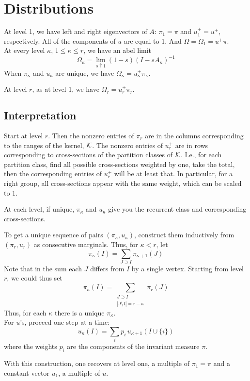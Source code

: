
\section{Distributions}
\label{sec:7.3}

At level 1, we have left and right eigenvectors of $A$: $\pi_1=\pi$ and $u_1^+=u^+$, respectively.
All of the components of $u$ are equal to 1. And $\Omega=\Omega_1=u^+\pi$.\\
At every level $\kappa$, $1\le \kappa\le r$, we have an abel limit 
$$
  \Omega_\kappa=\lim_{s\uparrow1} (1-s)(I-sA_\kappa)^{-1}
$$
When $\pi_\kappa$ and $u_\kappa$ are unique, we have $\Omega_\kappa=u_\kappa^+\pi_\kappa$.

At level $r$, as at level 1, we have $\Omega_r=u_r^+\pi_r$.


\subsection{Interpretation}
\label{sec:7.3.1}

Start at level $r$. Then the nonzero entries of $\pi_r$ are in the columns corresponding to the ranges of the kernel, ${\mathcal K}$. 
The nonzero entries of $u_r^+$ are in rows corresponding
to cross-sections of the partition classes of ${\mathcal K}$. 
I.e., for each partition class, find all possible cross-sections weighted by one, take the total, then the corresponding entries of $u_r^+$ will be at least that. 
In particular, for a right group, all cross-sections appear with the same weight, which can be scaled to 1.

At each level, if unique, $\pi_\kappa$ and $u_\kappa$ give you the recurrent class and corresponding cross-sections.

To get a unique sequence of pairs $(\pi_\kappa,u_\kappa)$, construct them inductively from 
$(\pi_r,u_r)$ as consecutive marginals. 
Thus, for $\kappa<r$, let
$$ 
  \pi_\kappa(I)=\sum_{J\supset I}\pi_{\kappa+1}(J) 
$$
Note that in the sum each $J$ differs from $I$ by a single vertex. Starting from level $r$, we could thus set
$$
  \pi_\kappa(I)
	=\sum_{\substack{J\supset I\\ |J\setminus I|=r-\kappa}}\pi_r(J) 
$$
Thus, for each $\kappa$ there is a unique $\pi_\kappa$.\\
For $u$'s, proceed one step at a time:
$$ u_\kappa(I)=\sum_i p_i \,u_{\kappa+1}(I\cup \{i\}) $$
where the weights $p_i$ are the components of the invariant measure $\pi$.

With this construction, one recovers at level one, a multiple of $\pi_1=\pi$ and a
constant vector $u_1$, a multiple of $u$.
